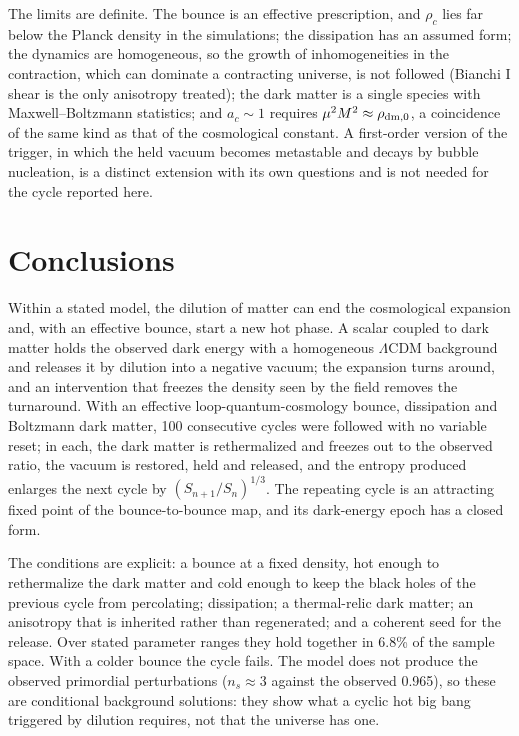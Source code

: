 \documentclass[pdflatex,sn-mathphys-num]{sn-jnl}
\begin{document}
The limits are definite. The bounce is an effective prescription, and $\rho_c$ lies far below the Planck density in the simulations; the dissipation has an assumed form; the dynamics are homogeneous, so the growth of inhomogeneities in the contraction, which can dominate a contracting universe, is not followed (Bianchi I shear is the only anisotropy treated); the dark matter is a single species with Maxwell--Boltzmann statistics; and $a_c\sim1$ requires $\mu^2M^2\approx\rho_{\rm dm,0}$, a coincidence of the same kind as that of the cosmological constant. A first-order version of the trigger, in which the held vacuum becomes metastable and decays by bubble nucleation, is a distinct extension with its own questions and is not needed for the cycle reported here.

\section{Conclusions}
Within a stated model, the dilution of matter can end the cosmological expansion and, with an effective bounce, start a new hot phase. A scalar coupled to dark matter holds the observed dark energy with a homogeneous $\Lambda$CDM background and releases it by dilution into a negative vacuum; the expansion turns around, and an intervention that freezes the density seen by the field removes the turnaround. With an effective loop-quantum-cosmology bounce, dissipation and Boltzmann dark matter, 100 consecutive cycles were followed with no variable reset; in each, the dark matter is rethermalized and freezes out to the observed ratio, the vacuum is restored, held and released, and the entropy produced enlarges the next cycle by $(S_{n+1}/S_n)^{1/3}$. The repeating cycle is an attracting fixed point of the bounce-to-bounce map, and its dark-energy epoch has a closed form.

The conditions are explicit: a bounce at a fixed density, hot enough to rethermalize the dark matter and cold enough to keep the black holes of the previous cycle from percolating; dissipation; a thermal-relic dark matter; an anisotropy that is inherited rather than regenerated; and a coherent seed for the release. Over stated parameter ranges they hold together in 6.8\% of the sample space. With a colder bounce the cycle fails. The model does not produce the observed primordial perturbations ($n_s\approx3$ against the observed 0.965), so these are conditional background solutions: they show what a cyclic hot big bang triggered by dilution requires, not that the universe has one.
\end{document}
